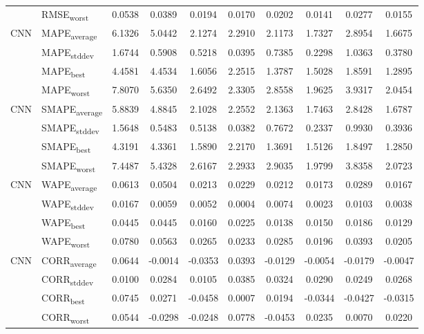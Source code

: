 {\begin{longtable}{l l c c c c c c c c}
 & RMSE\textsubscript{worst} & 0.0538 & 0.0389 & 0.0194 & 0.0170 & 0.0202 & 0.0141 & 0.0277 & 0.0155 \\
\cmidrule(lr){2-10}
\multirow{4}{*}{CNN} & MAPE\textsubscript{average} & 6.1326 & 5.0442 & 2.1274 & 2.2910 & 2.1173 & 1.7327 & 2.8954 & 1.6675 \\
 & MAPE\textsubscript{stddev} & 1.6744 & 0.5908 & 0.5218 & 0.0395 & 0.7385 & 0.2298 & 1.0363 & 0.3780 \\
 & MAPE\textsubscript{best} & 4.4581 & 4.4534 & 1.6056 & 2.2515 & 1.3787 & 1.5028 & 1.8591 & 1.2895 \\
 & MAPE\textsubscript{worst} & 7.8070 & 5.6350 & 2.6492 & 2.3305 & 2.8558 & 1.9625 & 3.9317 & 2.0454 \\
\cmidrule(lr){2-10}
\multirow{4}{*}{CNN} & SMAPE\textsubscript{average} & 5.8839 & 4.8845 & 2.1028 & 2.2552 & 2.1363 & 1.7463 & 2.8428 & 1.6787 \\
 & SMAPE\textsubscript{stddev} & 1.5648 & 0.5483 & 0.5138 & 0.0382 & 0.7672 & 0.2337 & 0.9930 & 0.3936 \\
 & SMAPE\textsubscript{best} & 4.3191 & 4.3361 & 1.5890 & 2.2170 & 1.3691 & 1.5126 & 1.8497 & 1.2850 \\
 & SMAPE\textsubscript{worst} & 7.4487 & 5.4328 & 2.6167 & 2.2933 & 2.9035 & 1.9799 & 3.8358 & 2.0723 \\
\cmidrule(lr){2-10}
\multirow{4}{*}{CNN} & WAPE\textsubscript{average} & 0.0613 & 0.0504 & 0.0213 & 0.0229 & 0.0212 & 0.0173 & 0.0289 & 0.0167 \\
 & WAPE\textsubscript{stddev} & 0.0167 & 0.0059 & 0.0052 & 0.0004 & 0.0074 & 0.0023 & 0.0103 & 0.0038 \\
 & WAPE\textsubscript{best} & 0.0445 & 0.0445 & 0.0160 & 0.0225 & 0.0138 & 0.0150 & 0.0186 & 0.0129 \\
 & WAPE\textsubscript{worst} & 0.0780 & 0.0563 & 0.0265 & 0.0233 & 0.0285 & 0.0196 & 0.0393 & 0.0205 \\
\cmidrule(lr){2-10}
\multirow{4}{*}{CNN} & CORR\textsubscript{average} & 0.0644 & -0.0014 & -0.0353 & 0.0393 & -0.0129 & -0.0054 & -0.0179 & -0.0047 \\
 & CORR\textsubscript{stddev} & 0.0100 & 0.0284 & 0.0105 & 0.0385 & 0.0324 & 0.0290 & 0.0249 & 0.0268 \\
 & CORR\textsubscript{best} & 0.0745 & 0.0271 & -0.0458 & 0.0007 & 0.0194 & -0.0344 & -0.0427 & -0.0315 \\
 & CORR\textsubscript{worst} & 0.0544 & -0.0298 & -0.0248 & 0.0778 & -0.0453 & 0.0235 & 0.0070 & 0.0220 \\

\end{longtable}}
